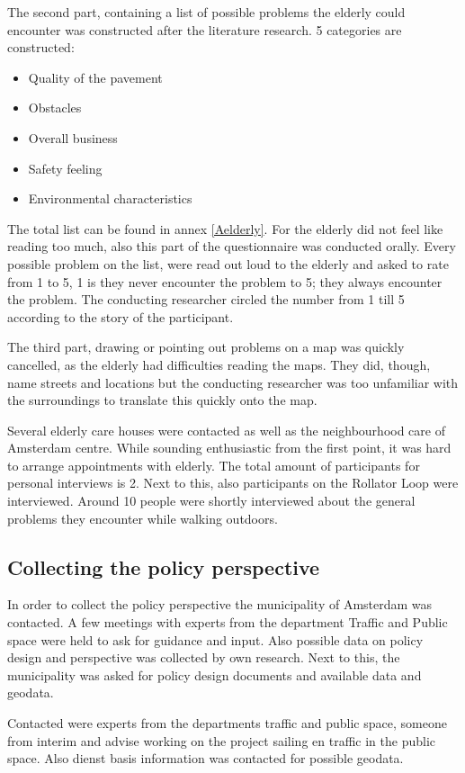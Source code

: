 The second part, containing a list of possible problems the elderly could encounter was constructed after the literature research. 5 categories are constructed:

\begin{itemize}
\item Quality of the pavement
\item Obstacles
\item Overall business
\item Safety feeling
\item Environmental characteristics
\end{itemize}

The total list can be found in annex \ref{Aelderly}. For the elderly did not feel like reading too much, also this part of the questionnaire was conducted orally. Every possible problem on the list, were read out loud to the elderly and asked to rate from 1 to 5, 1 is they never encounter the problem to 5; they always encounter the problem. The conducting researcher circled the number from 1 till 5 according to the story of the participant. 

The third part, drawing or pointing out problems on a map was quickly cancelled, as the elderly had difficulties reading the maps. They did, though, name streets and locations but the conducting researcher was too unfamiliar with the surroundings to translate this quickly onto the map. 

Several elderly care houses were contacted as well as the neighbourhood care of Amsterdam centre. While sounding enthusiastic from the first point, it was hard to arrange appointments with elderly. The total amount of participants for personal interviews is 2. Next to this, also participants on the Rollator Loop were interviewed. Around 10 people were shortly interviewed about the general problems they encounter while walking outdoors.

\subsection{Collecting the policy perspective}
In order to collect the policy perspective the municipality of Amsterdam was contacted. A few meetings with experts from the department Traffic and Public space were held to ask for guidance and input. 
Also possible data on policy design and perspective was collected by own research. Next to this, the municipality was asked for policy design documents and available data and geodata. 

Contacted were experts from the departments traffic and public space, someone from interim and advise working on the project sailing en traffic in the public space. Also dienst basis information was contacted for possible geodata. 





